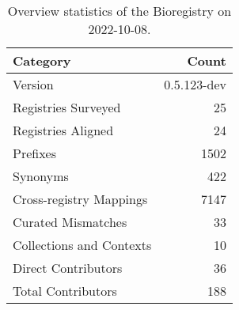 \begin{table}
\centering
\caption{Overview statistics of the Bioregistry on 2022-10-08.}
\label{tab:bioregistry-summary}
\begin{tabular}{lr}
\toprule
                Category &       Count \\
\midrule
                 Version & 0.5.123-dev \\
     Registries Surveyed &          25 \\
      Registries Aligned &          24 \\
                Prefixes &        1502 \\
                Synonyms &         422 \\
 Cross-registry Mappings &        7147 \\
      Curated Mismatches &          33 \\
Collections and Contexts &          10 \\
     Direct Contributors &          36 \\
      Total Contributors &         188 \\
\bottomrule
\end{tabular}
\end{table}
